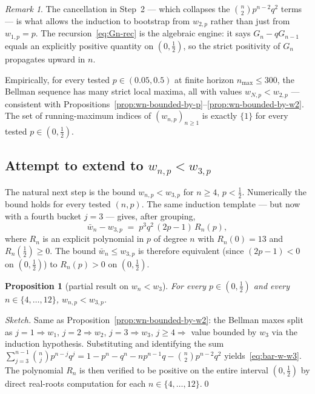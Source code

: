 \documentclass{article}
\newtheorem{proposition}{Proposition}
\theoremstyle{definition}
\theoremstyle{remark}
\newtheorem*{remark}{Remark}
\begin{document}
\begin{remark}
The cancellation in Step~2 — which collapses the
$\binom{n}{2}p^{n-2}q^{2}$ terms — is what allows the induction to
bootstrap from $w_{2,p}$ rather than just from $w_{1,p}=p$. The
recursion~\eqref{eq:Gn-rec} is the algebraic engine: it says
$G_{n}-qG_{n-1}$ equals an explicitly positive quantity on
$(0,\tfrac12)$, so the strict positivity of $G_{n}$ propagates upward
in $n$.
\end{remark}

Empirically, for every tested $p\in(0.05,0.5)$ at finite horizon
$n_{\max}\le 300$, the Bellman sequence has many strict local maxima,
all with values $w_{N,p}<w_{2,p}$ — consistent with
Propositions~\ref{prop:wn-bounded-by-p}--\ref{prop:wn-bounded-by-w2}.
The set of running-maximum indices of $(w_{n,p})_{n\ge 1}$ is
exactly $\{1\}$ for every tested $p\in(0,\tfrac12)$.

\subsection*{Attempt to extend to $w_{n,p}<w_{3,p}$}

The natural next step is the bound $w_{n,p}<w_{3,p}$ for $n\ge 4$,
$p<\tfrac12$. Numerically the bound holds for every tested
$(n,p)$. The same induction template — but now with a fourth bucket
$j=3$ — gives, after grouping,
\begin{equation}\label{eq:bar-w-w3}
  \bar w_n - w_{3,p}\;=\;p^{3}q^{2}\,(2p-1)\,R_n(p),
\end{equation}
where $R_n$ is an explicit polynomial in $p$ of degree $n$ with
$R_n(0)=13$ and $R_n(\tfrac12)\ge 0$. The bound $\bar w_n\le w_{3,p}$
is therefore equivalent (since $(2p-1)<0$ on $(0,\tfrac12)$) to
$R_n(p)>0$ on $(0,\tfrac12)$.

\begin{proposition}[partial result on $w_n<w_3$]\label{prop:wn-bounded-by-w3-partial}
For every $p\in(0,\tfrac12)$ and every $n\in\{4,\dots,12\}$,
$w_{n,p}<w_{3,p}$.
\end{proposition}

\emph{Sketch.} Same as Proposition~\ref{prop:wn-bounded-by-w2}: the
Bellman maxes split as $j=1\Rightarrow w_1$, $j=2\Rightarrow w_2$,
$j=3\Rightarrow w_3$, $j\ge 4\Rightarrow$ value bounded by $w_3$ via
the induction hypothesis. Substituting and identifying the
sum~$\sum_{j=3}^{n-1}\binom{n}{j}p^{n-j}q^{j}=1-p^n-q^n-np^{n-1}q-\binom{n}{2}p^{n-2}q^{2}$
yields~\eqref{eq:bar-w-w3}. The polynomial $R_n$ is then verified to
be positive on the entire interval $(0,\tfrac12)$ by direct
real-roots computation for each $n\in\{4,\dots,12\}$.\qed
\end{document}
